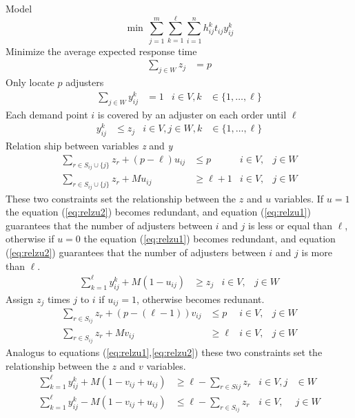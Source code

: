 Model
\begin{equation}
  \min \, \sum_{j=1}^{m}{
    \sum_{k=1}^{\ell}{
      \sum_{i=1}^{n}{
        h_{ij}^{k}t_{ij}y_{ij}^{k}
      }
    }
  }
\end{equation}
Minimize the average expected response time
\begin{align}
  \sum_{j \in W}{z_j}
  & = p
\end{align}
Only locate $p$ adjusters
\begin{align}
  \sum_{j \in W}{y_{ij}^{k}}
  & = 1
  & i \in V, k
  &\in \{1,\ldots,\ell\}
\end{align}
Each demand point $i$ is covered by an adjuster on each order until $\ell$
\begin{align}
  y_{ij}^{k}
  & \leq z_j
  & i \in V,j \in W, k
  &\in \{1,\ldots,\ell\}
\end{align}
Relation ship between variables \textit{z} and \textit{y}
\begin{align}
  \label{eq:relzu1}
  \sum_{r \in S_{ij}\cup\{j\}}{
    z_{r}
  }
  + (p-\ell) u_{ij}
  & \leq p
  & i \in V,
  & j \in W 
  \\
  \label{eq:relzu2}
  \sum_{r \in S_{ij}\cup\{j\}}{
    z_{r}
  }
  + M u_{ij}
  & \geq \ell+1
  & i \in V,
  & j \in W
\end{align}
These two constraints
set the relationship
between the $z$ and $u$ variables.
If $u = 1$
the equation (\ref{eq:relzu2}) becomes redundant,
and equation (\ref{eq:relzu1}) guarantees
that the number of adjusters between $i$ and $j$
is less or equal than $\ell$,
otherwise
if $u = 0$
the equation (\ref{eq:relzu1}) becomes redundant,
and equation (\ref{eq:relzu2}) guarantees
that the number of adjusters between $i$ and $j$
is more than $\ell$.
\begin{align}
  \sum_{k = 1}^{\ell}{
    y_{ij}^{k}
  }
  + M (1 - u_{ij})
  & \geq z_j
  & i \in V,
  & j \in W
\end{align}
Assign $z_j$ times $j$ to $i$ if $u_{ij}=1$,
otherwise
becomes redunant.
\begin{align}
  \sum_{r \in S_{ij}}{
    z_{r}
  }
  + (p-(\ell-1)) v_{ij}
  & \leq p
  & i \in V,
  & j \in W
  \\
  \sum_{r \in S_{ij}}{
    z_{r}
  }
  + M v_{ij}
  & \geq \ell
  & i \in V,
  & j \in W
\end{align}
Analogus to equations (\ref{eq:relzu1},\ref{eq:relzu2})
these two constraints
set the relationship
between the $z$ and $v$ variables.
\begin{align}
  \sum_{k=1}^{\ell}{
    y_{ij}^{k}
  }
  + M (1 - v_{ij} + u_{ij})
  & \geq \ell
  - \sum_{r \in S{ij}}{
    z_{r}
  } 
  &  i \in V, j 
  & \in W
  \\
  \sum_{k=1}^{\ell}{
    y_{ij}^{k}
  }
  - M (1 - v_{ij} + u_{ij})
  & \leq \ell 
  - \sum_{r \in S_{ij}}{
    z_{r}
  }
  & i \in V,
  & j \in W
\end{align}
